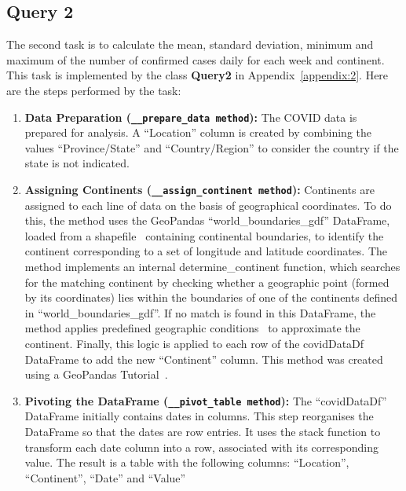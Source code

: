\documentclass[12pt,oneside]{book} %
\begin{document}
\subsection{Query 2}

The second task is to calculate the mean, standard deviation, minimum and
maximum of the number of confirmed cases daily for each week and continent.
This task is implemented by the class \textbf{Query2} in
Appendix~\ref{appendix:2}. Here are the steps performed by the task:
\begin{enumerate}
    \item \textbf{Data Preparation (\texttt{\_\_prepare\_data method}):} The COVID data is prepared for analysis. A ``Location'' column is created by combining the values ``Province/State'' and ``Country/Region'' to consider the country if the state is not indicated.

    \item \textbf{Assigning Continents (\texttt{\_\_assign\_continent method}):} Continents are assigned to each line of data on the basis of geographical coordinates. To do this, the method uses the GeoPandas ``world\_boundaries\_gdf'' DataFrame, loaded from a shapefile~\cite{ContinentsBoundariesShapefile} containing continental boundaries, to identify the continent corresponding to a set of longitude and latitude coordinates. The method implements an internal determine\_continent function, which searches for the matching continent by checking whether a geographic point (formed by its coordinates) lies within the boundaries of one of the continents defined in ``world\_boundaries\_gdf''. If no match is found in this DataFrame, the method applies predefined geographic conditions~\cite{GISGeography2023} to approximate the continent. Finally, this logic is applied to each row of the covidDataDf DataFrame to add the new ``Continent'' column. This method was created using a GeoPandas Tutorial~\cite{DataCamp2023GeoPandas}.

    \item \textbf{Pivoting the DataFrame (\texttt{\_\_pivot\_table method}):} The ``covidDataDf'' DataFrame initially contains dates in columns. This step reorganises the DataFrame so that the dates are row entries. It uses the stack function to transform each date column into a row, associated with its corresponding value. The result is a table with the following columns: ``Location'', ``Continent'', ``Date'' and ``Value''


\end{enumerate}
\end{document}
